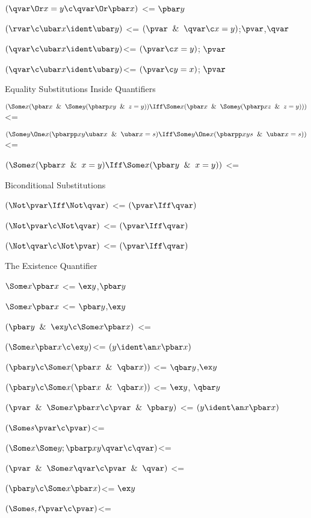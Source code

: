 $(\qvar \Or x = y \c\qvar \Or  \pbar x )$ <= $\pbar y$

$(\rvar \c \ubar x \ident \ubar y)$ <= $(\pvar \And \qvar \c x = y)$;$\pvar$,$\qvar$

$(\qvar \c \ubar x \ident \ubar y) $<= $(\pvar \c x = y)$; $\pvar$

$(\qvar \c \ubar x \ident \ubar y) $<= $(\pvar \c y = x)$; $\pvar$

\lineb


Equality Substitutions Inside Quantifiers
\lineb

$(\Some x (\pbar x \And \Some y (\pbarp xy \And z = y))\Iff \Some x(\pbar x \And \Some y (\pbarp xz \And z = y)))$ <= 

$(\Some y \One x(\pbarpp xy\ubar x\And \ubar x = s) \Iff \Some y \One x (\pbarpp x y s \And \ubar x = s))$ <= 

$(\Some x (\pbar x \And x = y)\Iff \Some x (\pbar y \And x=y))$ <=

\lineb

Biconditional Substitutions

\lineb

$(\Not \pvar \Iff \Not \qvar)$ <= $(\pvar \Iff \qvar)$

$(\Not \pvar \c \Not \qvar)$ <= $(\pvar \Iff \qvar)$

$(\Not \qvar \c \Not \pvar)$ <= $(\pvar \Iff \qvar)$

\lineb

The Existence Quantifier
\lineb

$\Some x \pbar x$ <= $\ex y$,$\pbar y$

$\Some x \pbar x$ <= $\pbar y$,$\ex y$

$(\pbar y \And \ex y \c \Some x \pbar x)$ <= 

$(\Some x \pbar x \c \ex y)$<= $(y \ident \an x \pbar x)$

$(\pbar y\c\Some x (\pbar x \And \qbar x))$ <= $\qbar y$,$\ex y$

$(\pbar y\c\Some x (\pbar x \And \qbar x))$ <= $\ex y$, $\qbar y$

$(\pvar \And \Some x \pbar x \c \pvar \And \pbar y)$ <= $(y \ident \an x \pbar x)$

$(\Some s \pvar \c \pvar)$<=

$(\Some x \Some y ; \pbarp xy \qvar \c \qvar)$<=

$(\pvar \And \Some x  \qvar\c \pvar \And \qvar)$ <= 

$(\pbar y \c \Some x \pbar x)$<=  $\ex y$

$(\Some s,t \pvar \c \pvar)$<=

